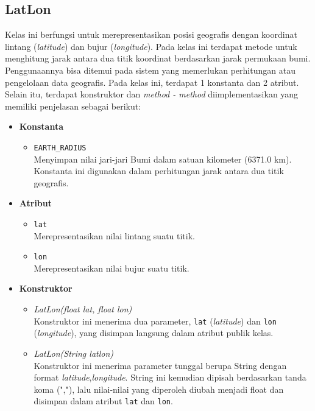 \subsection{LatLon}
Kelas ini berfungsi untuk merepresentasikan posisi geografis dengan koordinat lintang (\textit{latitude}) dan bujur (\textit{longitude}). Pada kelas ini terdapat metode untuk menghitung jarak antara dua titik koordinat berdasarkan jarak permukaan bumi. Penggunaannya bisa ditemui pada sistem yang memerlukan perhitungan atau pengelolaan data geografis. Pada kelas ini, terdapat 1 konstanta dan 2 atribut. Selain itu, terdapat konstruktor dan \textit{method - method} diimplementasikan yang memiliki penjelasan sebagai berikut:
\begin{itemize}
    \item \textbf{Konstanta}
    \begin{itemize}
        \item \texttt{EARTH\_RADIUS}
        \\ Menyimpan nilai jari-jari Bumi dalam satuan kilometer (6371.0 km). Konstanta ini digunakan dalam perhitungan jarak antara dua titik geografis.
    \end{itemize}
    \newpage
    \item \textbf{Atribut}
    \begin{itemize}
        \item \texttt{lat}
        \\ Merepresentasikan nilai lintang suatu titik.
        \item \texttt{lon}
        \\ Merepresentasikan nilai bujur suatu titik.
    \end{itemize}

    \item \textbf{Konstruktor}
    \begin{itemize}
        \item \textit{LatLon(float lat, float lon)}
        \\ Konstruktor ini menerima dua parameter, \texttt{lat} (\textit{latitude}) dan \texttt{lon} (\textit{longitude}), yang disimpan langsung dalam atribut publik kelas.
        \item \textit{LatLon(String latlon)}
        \\ Konstruktor ini menerima parameter tunggal berupa String dengan format \textit{latitude},\textit{longitude}. String ini kemudian dipisah berdasarkan tanda koma (","), lalu nilai-nilai yang diperoleh diubah menjadi float dan disimpan dalam atribut \texttt{lat} dan \texttt{lon}.
    \end{itemize}


\end{itemize}
